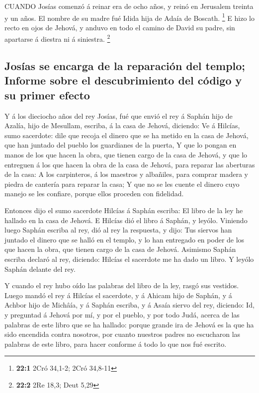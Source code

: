 CUANDO Josías comenzó á reinar era de ocho años, y reinó en
Jerusalem treinta y un años. El nombre de su madre fué Idida hija de
Adaía de Boscath. \footnote{\textbf{22:1} 2Cró 34,1-2; 2Cró 34,8-11}
 E hizo lo recto en ojos de Jehová, y anduvo en todo el
camino de David su padre, sin apartarse á diestra ni á siniestra.
\footnote{\textbf{22:2} 2Re 18,3; Deut 5,29}

\hypertarget{josuxedas-se-encarga-de-la-reparaciuxf3n-del-templo-informe-sobre-el-descubrimiento-del-cuxf3digo-y-su-primer-efecto}{%
\subsection{Josías se encarga de la reparación del templo; Informe sobre
el descubrimiento del código y su primer
efecto}\label{josuxedas-se-encarga-de-la-reparaciuxf3n-del-templo-informe-sobre-el-descubrimiento-del-cuxf3digo-y-su-primer-efecto}}

 Y á los dieciocho años del rey Josías, fué que envió el rey
á Saphán hijo de Azalía, hijo de Mesullam, escriba, á la casa de Jehová,
diciendo:  Ve á Hilcías, sumo sacerdote: dile que recoja el
dinero que se ha metido en la casa de Jehová, que han juntado del pueblo
los guardianes de la puerta,  Y que lo pongan en manos de
los que hacen la obra, que tienen cargo de la casa de Jehová, y que lo
entreguen á los que hacen la obra de la casa de Jehová, para reparar las
aberturas de la casa:  A los carpinteros, á los maestros y
albañiles, para comprar madera y piedra de cantería para reparar la
casa;  Y que no se les cuente el dinero cuyo manejo se les
confiare, porque ellos proceden con fidelidad.

 Entonces dijo el sumo sacerdote Hilcías á Saphán escriba:
El libro de la ley he hallado en la casa de Jehová. E Hilcías dió el
libro á Saphán, y leyólo.  Viniendo luego Saphán escriba al
rey, dió al rey la respuesta, y dijo: Tus siervos han juntado el dinero
que se halló en el templo, y lo han entregado en poder de los que hacen
la obra, que tienen cargo de la casa de Jehová.  Asimismo
Saphán escriba declaró al rey, diciendo: Hilcías el sacerdote me ha dado
un libro. Y leyólo Saphán delante del rey.

 Y cuando el rey hubo oído las palabras del libro de la
ley, rasgó sus vestidos.  Luego mandó el rey á Hilcías el
sacerdote, y á Ahicam hijo de Saphán, y á Achbor hijo de Michâía, y á
Saphán escriba, y á Asaía siervo del rey, diciendo:  Id, y
preguntad á Jehová por mí, y por el pueblo, y por todo Judá, acerca de
las palabras de este libro que se ha hallado: porque grande ira de
Jehová es la que ha sido encendida contra nosotros, por cuanto nuestros
padres no escucharon las palabras de este libro, para hacer conforme á
todo lo que nos fué escrito.

